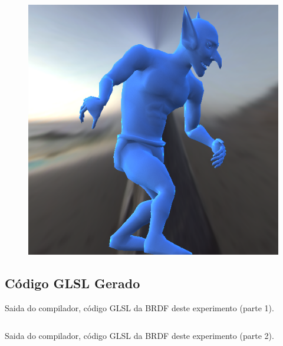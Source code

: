 \begin{figure}[H]
\endminipage\hfill
{}%
  \includegraphics[width=\linewidth]{./Imagens/brdfs/ashikhmin-shirley-alternative-goblin.png}
\endminipage
\end{figure}

\subsection{Código GLSL Gerado}
\begin{codigo}[H]
    \caption{\small Saida do compilador, código GLSL da BRDF deste experimento (parte 1). }
    \label{cod-ashikhmin-shirley-alternative-eqlang-declarations}
\begin{lstlisting}[language=C, inputencoding=utf8]
\end{lstlisting}
\end{codigo}

\begin{codigo}[H]
    \caption{\small Saida do compilador, código GLSL da BRDF deste experimento  (parte 2). }
    \label{cod-ashikhmin-shirley-alternative-eqlang}
\begin{lstlisting}[language=C, inputencoding=utf8]
\end{lstlisting}
\end{codigo}

